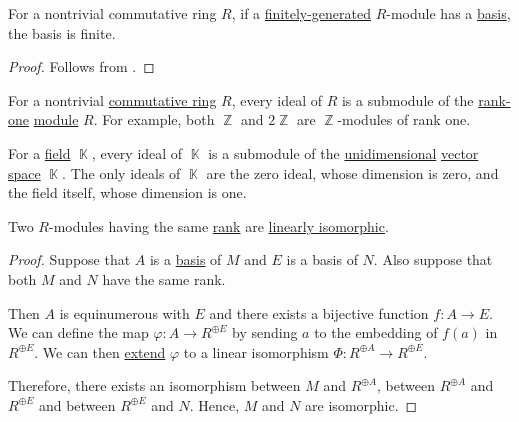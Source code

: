 \begin{corollary}\label{thm:finitely_generated_module_basis}
  For a nontrivial commutative ring \( R \), if a \hyperref[def:module_presentation]{finitely-generated} \( R \)-module has a \hyperref[def:hamel_basis]{basis}, the basis is finite.
\end{corollary}
\begin{proof}
  Follows from .
\end{proof}

\begin{example}\label{ex:field_submodules}
  For a nontrivial \hyperref[def:ring/commutative]{commutative ring} \( R \), every ideal of \( R \) is a submodule of the \hyperref[thm:commutative_module_rank]{rank-one} \hyperref[def:module]{module} \( R \). For example, both \( \BbbZ \) and \( 2\BbbZ \) are \( \BbbZ \)-modules of rank one.

  For a \hyperref[def:field]{field} \( \BbbK \), every ideal of \( \BbbK \) is a submodule of the \hyperref[thm:vector_space_dimension]{unidimensional} \hyperref[def:vector_space]{vector space} \( \BbbK \). The only ideals of \( \BbbK \) are the zero ideal, whose dimension is zero, and the field itself, whose dimension is one.
\end{example}

\begin{proposition}\label{thm:modules_with_same_rank_are_isomorphic}
  Two \( R \)-modules having the same \hyperref[thm:commutative_module_rank]{rank} are \hyperref[def:semimodule/homomorphism]{linearly isomorphic}.
\end{proposition}
\begin{proof}
  Suppose that \( A \) is a \hyperref[def:hamel_basis]{basis} of \( M \) and \( E \) is a basis of \( N \). Also suppose that both \( M \) and \( N \) have the same rank.

  Then \( A \) is equinumerous with \( E \) and there exists a bijective function \( f: A \to E \). We can define the map \( \varphi: A \to R^{\oplus E} \) by sending \( a \) to the embedding of \( f(a) \) in \( R^{\oplus E} \). We can then \hyperref[thm:free_semimodule_universal_property]{extend} \( \varphi \) to a linear isomorphism \( \Phi: R^{\oplus A} \to R^{\oplus E} \).

  Therefore, there exists an isomorphism between \( M \) and \( R^{\oplus A} \), between \( R^{\oplus A} \) and \( R^{\oplus E} \) and between \( R^{\oplus E} \) and \( N \). Hence, \( M \) and \( N \) are isomorphic.
\end{proof}

